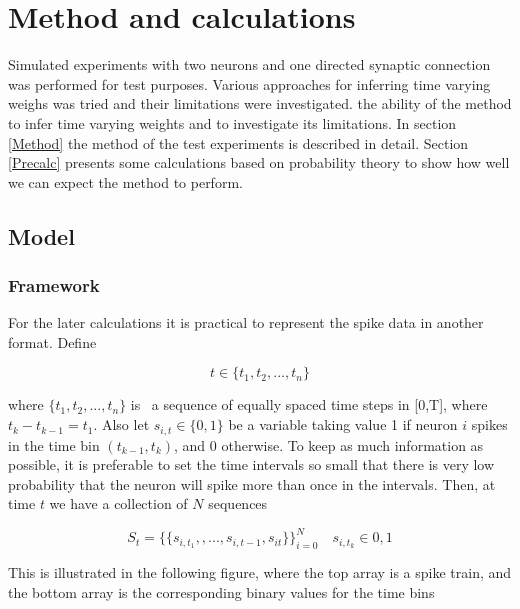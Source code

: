 
\chapter{Method and calculations}

Simulated experiments with two neurons and one directed synaptic connection was performed for test purposes. Various approaches for inferring time varying weighs was tried and their limitations were investigated.  the ability of the method to infer time varying weights and to investigate its limitations. In section \ref{Method} the method of the test experiments is described in detail. Section \ref{Precalc} presents some calculations based on probability theory to show how well we can expect the method to perform.

\section{Model}
\label{set_up}

\subsection{Framework}
For the later calculations it is practical to represent the spike data in another format. Define

\begin{equation}
    t \in \{t_1, t_2, ..., t_n\} 
\end{equation}

 where $\{t_1, t_2, ..., t_n\}$ is \ a sequence of equally spaced time steps in [0,T], where $t_{k}-t_{k-1} = t_1$. Also let $s_{i,t} \in \{0,1\}$ be a variable taking value 1 if neuron $i$ spikes in the time bin $(t_{k-1}, t_{k})$, and 0 otherwise. To keep as much information as possible, it is preferable to set the time intervals so small that there is very low probability that the neuron will spike more than once in the intervals. Then, at time $t$ we have a collection of $N$ sequences

\begin{equation}
    S_{t} = \{\{s_{i,t_1}, ,...,s_{i,t-1},s_{it}\}\}_{i=0}^{N} \quad s_{i,t_k} \in {0,1}
\end{equation}

This is illustrated in the following figure, where the top array is a spike train, and the bottom array is the corresponding binary values for the time bins

